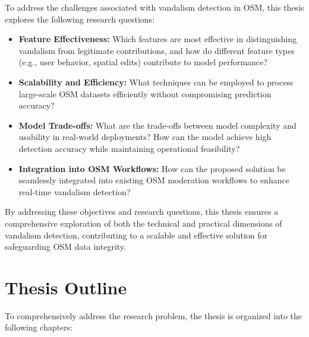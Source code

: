 \documentclass[
    13pt, %
    a4paper, %
    listof=totoc, %
    bibliography=totoc, %
    index=totoc, %
    headsepline
]{scrreprt}
\begin{document}
To address the challenges associated with vandalism detection in OSM, this thesis explores the following research questions:

\begin{itemize}
    \item \textbf{Feature Effectiveness:} Which features are most effective in distinguishing vandalism from legitimate contributions, and how do different feature types (e.g., user behavior, spatial edits) contribute to model performance?

    \item \textbf{Scalability and Efficiency:} What techniques can be employed to process large-scale OSM datasets efficiently without compromising prediction accuracy?

    \item \textbf{Model Trade-offs:} What are the trade-offs between model complexity and usability in real-world deployments? How can the model achieve high detection accuracy while maintaining operational feasibility?

    \item \textbf{Integration into OSM Workflows:} How can the proposed solution be seamlessly integrated into existing OSM moderation workflows to enhance real-time vandalism detection?
\end{itemize}

\noindent By addressing these objectives and research questions, this thesis ensures a comprehensive exploration of both the technical and practical dimensions of vandalism detection, contributing to a scalable and effective solution for safeguarding OSM data integrity.


\section{Thesis Outline}

To comprehensively address the research problem, the thesis is organized into the following chapters:
\end{document}
